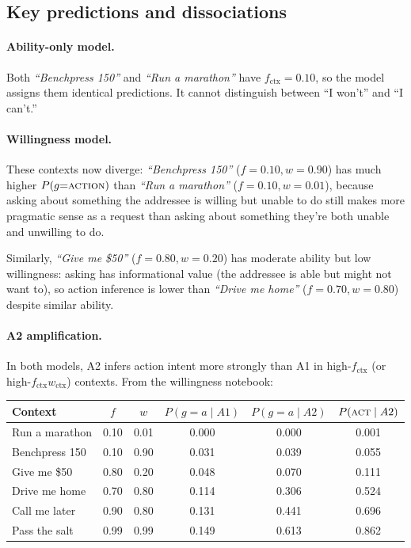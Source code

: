 \documentclass[11pt]{article}
\begin{document}
\subsection{Key predictions and dissociations}

\paragraph{Ability-only model.} Both \emph{``Benchpress 150''} and
\emph{``Run a marathon''} have $f_{\text{ctx}} = 0.10$, so the model assigns
them identical predictions. It cannot distinguish between ``I won't'' and
``I can't.''

\paragraph{Willingness model.} These contexts now diverge: \emph{``Benchpress 150''}
($f{=}0.10, w{=}0.90$) has much higher $P(g{=}\textsc{action})$ than
\emph{``Run a marathon''} ($f{=}0.10, w{=}0.01$), because asking about something
the addressee is willing but unable to do still makes more pragmatic sense as a
request than asking about something they're both unable and unwilling to do.

Similarly, \emph{``Give me \$50''} ($f{=}0.80, w{=}0.20$) has moderate ability but
low willingness: asking has informational value (the addressee is able but might
not want to), so action inference is lower than \emph{``Drive me home''}
($f{=}0.70, w{=}0.80$) despite similar ability.

\paragraph{A2 amplification.} In both models, A2 infers action intent more
strongly than A1 in high-$f_{\text{ctx}}$ (or high-$f_{\text{ctx}} w_{\text{ctx}}$)
contexts. From the willingness notebook:

\begin{center}
\renewcommand{\arraystretch}{1.2}
\begin{tabular}{lccccc}
\toprule
\textbf{Context} & $f$ & $w$ & $P(g{=}a \mid A1)$ & $P(g{=}a \mid A2)$ & $P(\textsc{act} \mid A2)$ \\
\midrule
Run a marathon   & 0.10 & 0.01 & 0.000 & 0.000 & 0.001 \\
Benchpress 150   & 0.10 & 0.90 & 0.031 & 0.039 & 0.055 \\
Give me \$50     & 0.80 & 0.20 & 0.048 & 0.070 & 0.111 \\
Drive me home    & 0.70 & 0.80 & 0.114 & 0.306 & 0.524 \\
Call me later    & 0.90 & 0.80 & 0.131 & 0.441 & 0.696 \\
Pass the salt    & 0.99 & 0.99 & 0.149 & 0.613 & 0.862 \\
\bottomrule
\end{tabular}
\end{center}
\end{document}
